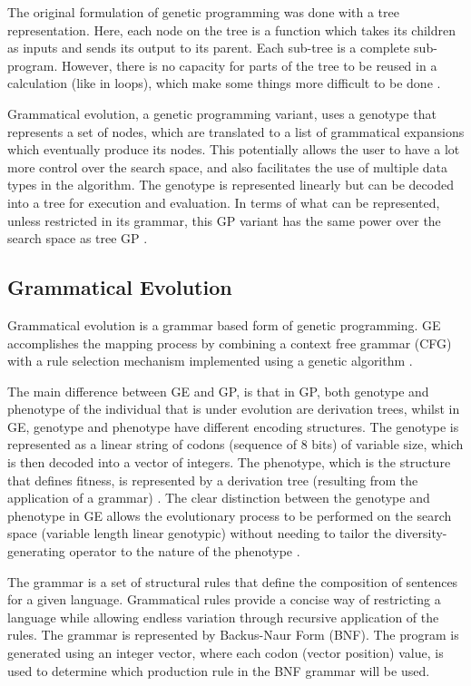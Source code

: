 \documentclass[journal]{IEEEtran}
\begin{document}
	The original formulation of genetic programming was done with a tree representation. Here, each node on the tree is a function which takes its children as inputs and sends its output to its parent. Each sub-tree is a complete sub-program. However, there is no capacity for parts of the tree to be reused in a calculation (like in loops), which make some things more difficult to be done \cite{harris2015comparison}. 
	
	Grammatical evolution, a genetic programming variant, uses a genotype that represents a set of nodes, which are translated to a list of grammatical expansions which eventually produce its nodes. This potentially allows the user to have a lot more control over the search space, and also facilitates the use of multiple data types in the algorithm. The genotype is represented linearly but can be decoded into a tree for execution and evaluation. In terms of what can be represented, unless restricted in its grammar, this GP variant has the same power over the search space as tree GP \cite{harris2015comparison}.
	
	
	\subsection{Grammatical Evolution} \label{subsection:grammaticalEvolution}
	
	Grammatical evolution is a grammar based form of genetic programming. GE accomplishes the mapping process by combining a context free grammar (CFG) with a rule selection mechanism implemented using a genetic algorithm \cite{byrne2015optimising}.
	
	The main difference between GE and GP, is that in GP, both genotype and phenotype of the individual that is under evolution are derivation trees, whilst in GE, genotype and phenotype have different encoding structures. The genotype is represented as a linear string of codons (sequence of 8 bits) of variable size, which is then decoded into a vector of integers. The phenotype, which is the structure that defines fitness, is represented by a derivation tree (resulting from the application of a grammar) \cite{cerri2013grammatical}. The clear distinction between the genotype and phenotype in GE allows the evolutionary process to be performed on the search space (variable length linear genotypic) without needing to tailor the diversity-generating operator to the nature of the phenotype \cite{sabar2013grammatical}.
	
	The grammar is a set of structural rules that define the composition of sentences for a given language. Grammatical rules provide a concise way of restricting a language while allowing endless variation through recursive application of the rules\cite{byrne2015optimising}. The grammar is represented by Backus-Naur Form (BNF). The program is generated using an integer vector, where each codon (vector position) value, is used to determine which production rule in the BNF grammar will be used.
	
\end{document}
